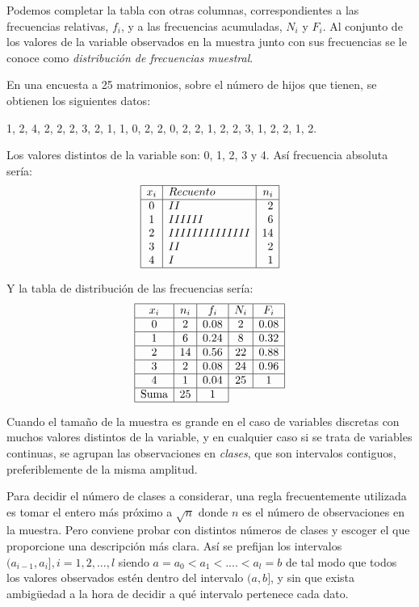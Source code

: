Podemos completar la tabla con otras columnas, correspondientes a las frecuencias relativas, $f_i$, y a las frecuencias acumuladas, $N_i$ y $F_i$.
Al conjunto de los valores de la variable observados en la muestra junto con sus frecuencias se le conoce como \emph{distribución de frecuencias muestral}.

\begin{ejemplo}
En una encuesta a 25 matrimonios, sobre el número de hijos que tienen, se obtienen los siguientes datos:

1, 2, 4, 2, 2, 2, 3, 2, 1, 1, 0, 2, 2, 0, 2, 2, 1, 2, 2, 3, 1, 2,
2, 1, 2.

Los valores distintos de la variable son: 0, 1, 2, 3 y 4. Así frecuencia absoluta sería:
\[
\begin{array}{|c|l|r|}
\hline
x_i & Recuento & n_i \\ \hline
0 & II & 2 \\
1 & IIIII I & 6 \\
2 & IIIII IIIII IIII & 14 \\
3 & II & 2 \\
4 & I & 1 \\ \hline
\end{array}
\]

Y la tabla de distribución de las frecuencias sería:
\[
\begin{array}{|c|c|c|c|c|}
\hline
x_i & n_i & f_i & N_i & F_i \\ \hline
0 & 2 & 0.08 & 2 & 0.08 \\ \hline
1 & 6 & 0.24 & 8 & 0.32 \\ \hline
2 & 14 & 0.56 & 22 & 0.88 \\ \hline
3 & 2 & 0.08 & 24 & 0.96 \\ \hline
4 & 1 & 0.04 & 25 & 1 \\ \hline
\mbox{Suma} & 25 & 1 & \multicolumn{2}{c}{} \\
\cline{1-3}
\end{array}
\]

\end{ejemplo}

Cuando el tamaño de la muestra es grande en el caso de variables discretas con muchos valores distintos de la variable, y en cualquier caso si se trata de variables continuas, se agrupan las observaciones en \emph{clases}, que son intervalos contiguos, preferiblemente de la misma amplitud.

Para decidir el número de clases a considerar, una regla frecuentemente utilizada es tomar el entero más próximo a $\sqrt{n}$ donde $n$ es el número de observaciones en la muestra.
Pero conviene probar con distintos números de clases y escoger el que proporcione una descripción más clara.
Así se prefijan los intervalos $(a_{i-1},a_i] , i=1,2,\ldots,l$ siendo $a=a_0<a_1<....<a_l=b$ de tal modo que todos los valores observados estén dentro del intervalo $(a, b]$, y sin que exista ambig\"{u}edad a la hora de decidir a qué intervalo pertenece cada dato.

